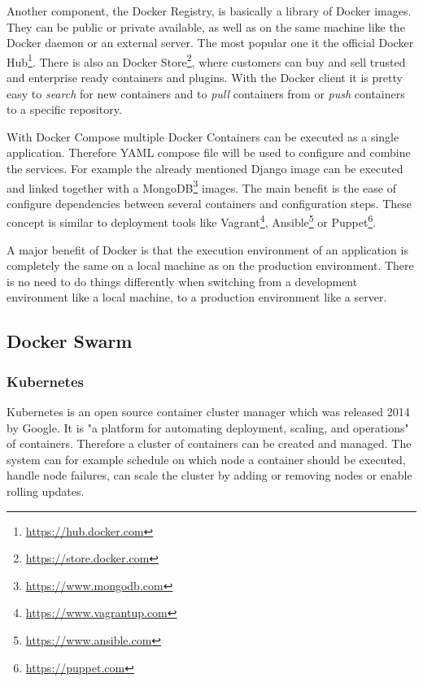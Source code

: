 Another component, the Docker Registry, is basically a library of Docker images.
They can be public or private available, as well as on the same machine like the Docker daemon or an external server.\cite[cf.]{dockerEngine}
The most popular one it the official Docker Hub\footnote{\url{https://hub.docker.com}}.
There is also an Docker Store\footnote{\url{https://store.docker.com}}, where customers can buy and sell trusted and enterprise ready containers and plugins.
With the Docker client it is pretty easy to \textit{search} for new containers and to \textit{pull} containers from or \textit{push} containers to a specific repository.

With Docker Compose multiple Docker Containers can be executed as a single application.
Therefore YAML compose file will be used to configure and combine the services.
For example the already mentioned Django image can be executed and linked together with a MongoDB\footnote{\url{https://www.mongodb.com}} images.
The main benefit is the ease of configure dependencies between several containers and configuration steps.
These concept is similar to deployment tools like Vagrant\footnote{\url{https://www.vagrantup.com}}, Ansible\footnote{\url{https://www.ansible.com}} or Puppet\footnote{\url{https://puppet.com}}.

A major benefit of Docker is that the execution environment of an application is completely the same on a local machine as on the production environment.\cite[cf.][p. 2]{Gallagher:2015}
There is no need to do things differently when switching from a development environment like a local machine, to a production environment like a server.\cite[cf.][p. 2]{Gallagher:2015}

\subsection{Docker Swarm}
\doit

\subsubsection{Kubernetes}
Kubernetes is an open source container cluster manager which was released 2014 by Google.
It is "a platform for automating deployment, scaling, and operations"\cite[p. 1]{Grant:2015} of containers.
Therefore a cluster of containers can be created and managed.
The system can for example schedule on which node a container should be executed, handle node failures, can scale the cluster by adding or removing nodes or enable rolling updates.\cite[p. 5 f.]{Grant:2015}

